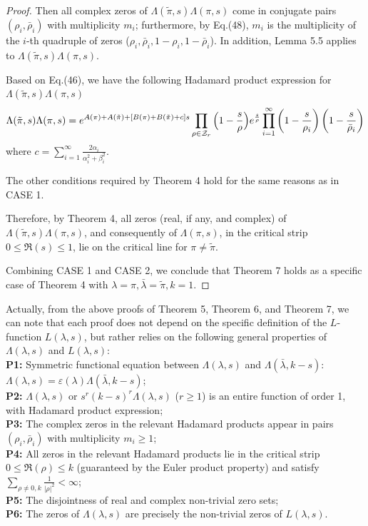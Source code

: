 \documentclass[12pt]{article}
\begin{document}
\begin{proof}
 Then all complex zeros of $\Lambda(\tilde{\pi}, s) \Lambda(\pi, s)$  come in conjugate pairs $(\rho_i, \bar\rho_i)$ with multiplicity $m_i$; furthermore, by Eq.(48), $m_i$ is the multiplicity of the $i$-th quadruple of zeros ($\rho_i, \bar\rho_i, 1-\rho_i, 1-\bar\rho_i$). In addition, Lemma 5.5 applies to $\Lambda(\tilde{\pi}, s) \Lambda(\pi, s)$.

 Based on Eq.(46), we have the following Hadamard product expression for $\Lambda(\tilde{\pi}, s) \Lambda(\pi, s)$
 \begin{equation}\Lambda(\tilde{\pi}, s) \Lambda(\pi, s) = e^{A(\pi) + A(\tilde{\pi})+[B(\pi)+B(\tilde{\pi})+c]s}\prod_{\rho \in \mathcal{Z}_{r}}\Big{(}1-\frac{s}{\rho}\Big{)}e^{\frac{s}{\rho}} \prod_{i=1}^{\infty} \left(1 - \frac{s}{\rho_i}\right)\left(1 - \frac{s}{\bar{\rho}_i}\right)  \end{equation}
 where $c=\sum_{i=1}^{\infty}\frac{2\alpha_i}{\alpha_i^2+\beta_i^2}$.

 The other conditions required by Theorem 4 hold for the same reasons as in CASE 1.

 Therefore, by Theorem 4, all zeros (real, if any, and complex) of $\Lambda(\tilde{\pi}, s) \Lambda(\pi, s)$, and consequently of $\Lambda(\pi, s)$, in the critical strip $0 \leq \Re(s) \leq 1$, lie on the critical line for $\pi \neq \tilde{\pi}$.

 Combining CASE 1 and CASE 2, we conclude that Theorem 7 holds as a specific case of Theorem 4 with $\lambda=\pi, \bar\lambda = \tilde{\pi}, k=1$.
\end{proof}

Actually, from the above proofs of Theorem 5, Theorem 6, and Theorem 7, we can note that each proof does not depend on the specific definition of the $L$-function $L(\lambda, s)$, but rather relies on the following general properties of $\Lambda(\lambda, s)$ and $L(\lambda, s)$: \\
\textbf{P1:} Symmetric functional equation between $\Lambda(\lambda, s)$ and $\Lambda(\bar{\lambda}, k-s)$: $\Lambda(\lambda, s) = \varepsilon(\lambda) \Lambda(\bar{\lambda}, k-s)$;\\
\textbf{P2:} $\Lambda(\lambda, s)$ or $s^r(k-s)^r\Lambda(\lambda, s)$ ($r\geq 1$) is an entire function of order 1, with Hadamard product expression;\\
\textbf{P3:} The complex zeros in the relevant Hadamard products appear in pairs $(\rho_i, \bar\rho_i)$ with multiplicity $m_i\ge 1$;\\
\textbf{P4:} All zeros in the relevant Hadamard products lie in the critical strip $0 \leq \Re(\rho) \leq k$ (guaranteed by the Euler product property) and satisfy $\displaystyle\sum_{\rho\neq 0, k} \frac{1}{|\rho|^2} < \infty$;\\
\textbf{P5:} The disjointness of real and complex non-trivial zero sets;\\
\textbf{P6:} The zeros of $\Lambda(\lambda, s)$ are precisely the non-trivial zeros of $L(\lambda, s)$.\\
\end{document}
